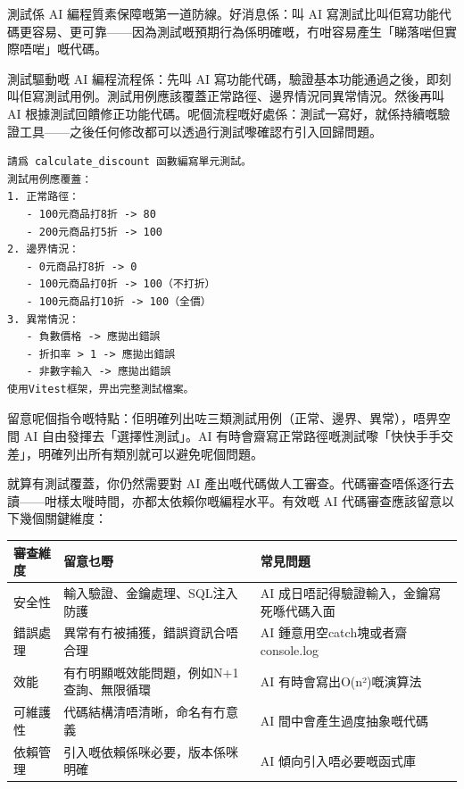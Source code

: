 


測試係 AI 編程質素保障嘅第一道防線。好消息係：叫 AI 寫測試比叫佢寫功能代碼更容易、更可靠——因為測試嘅預期行為係明確嘅，冇咁容易產生「睇落啱但實際唔啱」嘅代碼。

測試驅動嘅 AI 編程流程係：先叫 AI 寫功能代碼，驗證基本功能通過之後，即刻叫佢寫測試用例。測試用例應該覆蓋正常路徑、邊界情況同異常情況。然後再叫 AI 根據測試回饋修正功能代碼。呢個流程嘅好處係：測試一寫好，就係持續嘅驗證工具——之後任何修改都可以透過行測試嚟確認冇引入回歸問題。

\begin{lstlisting}
請爲 calculate_discount 函數編寫單元測試。
測試用例應覆蓋：
1. 正常路徑：
   - 100元商品打8折 -> 80
   - 200元商品打5折 -> 100
2. 邊界情況：
   - 0元商品打8折 -> 0
   - 100元商品打0折 -> 100（不打折）
   - 100元商品打10折 -> 100（全價）
3. 異常情況：
   - 負數價格 -> 應拋出錯誤
   - 折扣率 > 1 -> 應拋出錯誤
   - 非數字輸入 -> 應拋出錯誤
使用Vitest框架，畀出完整測試檔案。
\end{lstlisting}

留意呢個指令嘅特點：佢明確列出咗三類測試用例（正常、邊界、異常），唔畀空間 AI 自由發揮去「選擇性測試」。AI 有時會齋寫正常路徑嘅測試嚟「快快手手交差」，明確列出所有類別就可以避免呢個問題。


就算有測試覆蓋，你仍然需要對 AI 產出嘅代碼做人工審查。代碼審查唔係逐行去讀——咁樣太嘥時間，亦都太依賴你嘅編程水平。有效嘅 AI 代碼審查應該留意以下幾個關鍵維度：

\begin{center}
\begin{tabularx}{\linewidth}{|X|X|X|}
\hline
\textbf{審查維度} & \textbf{留意乜嘢} & \textbf{常見問題} \tabularnewline
\hline
安全性 & 輸入驗證、金鑰處理、SQL注入防護 & AI 成日唔記得驗證輸入，金鑰寫死喺代碼入面 \tabularnewline
錯誤處理 & 異常有冇被捕獲，錯誤資訊合唔合理 & AI 鍾意用空catch塊或者齋console.log \tabularnewline
效能 & 有冇明顯嘅效能問題，例如N+1查詢、無限循環 & AI 有時會寫出O(n²)嘅演算法 \tabularnewline
可維護性 & 代碼結構清唔清晰，命名有冇意義 & AI 間中會產生過度抽象嘅代碼 \tabularnewline
依賴管理 & 引入嘅依賴係咪必要，版本係咪明確 & AI 傾向引入唔必要嘅函式庫 \tabularnewline
\hline
\end{tabularx}
\end{center}

